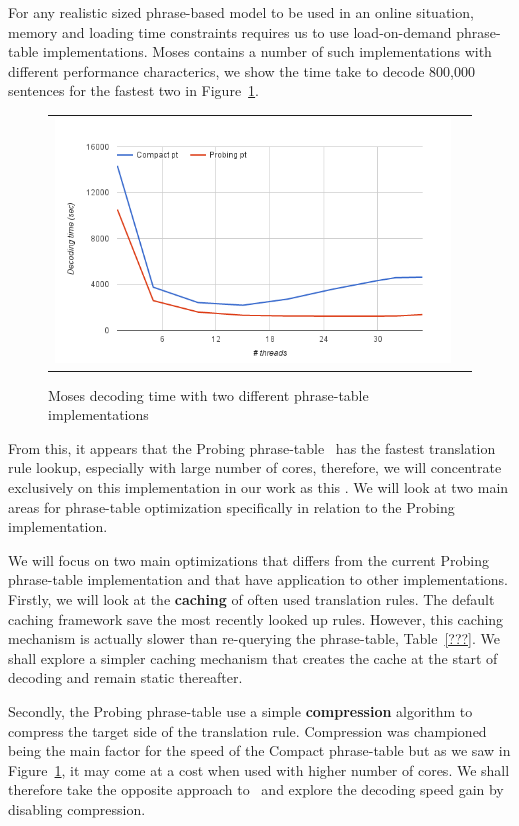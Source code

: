 \documentclass[11pt]{article}
\begin{document}
For any realistic sized phrase-based model to be used in an online situation, memory and loading time constraints requires us to use load-on-demand phrase-table implementations. Moses contains a number of such implementations with different performance characterics, we show the time take to decode 800,000 sentences for the fastest two in Figure~\ref{fig:moses-phrase-tables-time}.
\begin{figure}[h]
\centering
\begin{tabular}{cc}
{\includegraphics[scale=0.4]{moses-phrase-table.png}} 
\end{tabular}
\caption{Moses decoding time with two different phrase-table implementations}
\label{fig:moses-phrase-tables-time}
\end{figure} 
From this, it appears that the Probing phrase-table~\cite{Bogochev:Thesis:2013} has the fastest translation rule lookup, especially with large number of cores, therefore, we will concentrate exclusively on this implementation in our work as this . We will look at two main areas for phrase-table optimization specifically in relation to the Probing implementation.

We will focus on two main optimizations that differs from the current Probing phrase-table implementation and that have application to other implementations. Firstly, we will look at the \textbf{caching} of often used translation rules. The default caching framework save the most recently looked up rules. However, this caching mechanism is actually slower than re-querying the phrase-table, Table~\ref{???}. We shall explore a simpler caching mechanism that creates the cache at the start of decoding and remain static thereafter.

Secondly, the Probing phrase-table use a simple \textbf{compression} algorithm to compress the target side of the translation rule. Compression was championed being the main factor for the speed of the Compact phrase-table but as we saw in Figure~\ref{fig:moses-phrase-tables-time}, it may come at a cost when used with higher number of cores. We shall therefore take the opposite approach to~ and explore the decoding speed gain by disabling compression.
\end{document}
